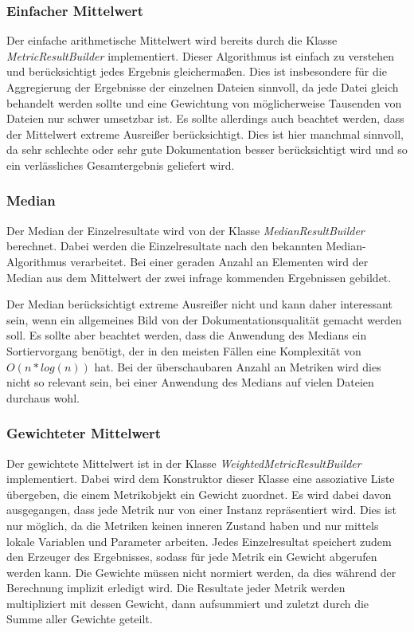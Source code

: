 \subsubsection{Einfacher Mittelwert}
Der einfache arithmetische Mittelwert wird bereits durch die Klasse \textit{MetricResultBuilder} implementiert. Dieser Algorithmus ist einfach zu verstehen und berücksichtigt jedes Ergebnis gleichermaßen. Dies ist insbesondere für die Aggregierung der Ergebnisse der einzelnen Dateien sinnvoll, da jede Datei gleich behandelt werden sollte und eine Gewichtung von möglicherweise Tausenden von Dateien nur schwer umsetzbar ist. Es sollte allerdings auch beachtet werden, dass der Mittelwert extreme Ausreißer berücksichtigt. Dies ist hier manchmal sinnvoll, da sehr schlechte oder sehr gute Dokumentation besser berücksichtigt wird und so ein verlässliches Gesamtergebnis geliefert wird.


\subsubsection{Median}
Der Median der Einzelresultate wird von der Klasse \textit{MedianResultBuilder} berechnet. Dabei werden die Einzelresultate nach den bekannten Median-Algorithmus verarbeitet. Bei einer geraden Anzahl an Elementen wird der Median aus dem Mittelwert der zwei infrage kommenden Ergebnissen gebildet. 

Der Median berücksichtigt extreme Ausreißer nicht und kann daher interessant sein, wenn ein allgemeines Bild von der Dokumentationsqualität gemacht werden soll. Es sollte aber beachtet werden, dass die Anwendung des Medians ein Sortiervorgang benötigt, der in den meisten Fällen eine Komplexität von $O(n*log(n))$ hat. Bei der überschaubaren Anzahl an Metriken wird dies nicht so relevant sein, bei einer Anwendung des Medians auf vielen Dateien durchaus wohl.


\subsubsection{Gewichteter Mittelwert}
Der gewichtete Mittelwert ist in der Klasse \textit{WeightedMetricResultBuilder} implementiert. Dabei wird dem Konstruktor dieser Klasse eine assoziative Liste übergeben, die einem Metrikobjekt ein Gewicht zuordnet.  Es wird dabei davon ausgegangen, dass jede Metrik nur von einer Instanz repräsentiert wird. Dies ist nur möglich, da die Metriken keinen inneren Zustand haben und nur mittels lokale Variablen und Parameter arbeiten. Jedes Einzelresultat speichert zudem den Erzeuger des Ergebnisses, sodass für jede Metrik ein Gewicht abgerufen werden kann. Die Gewichte müssen nicht normiert werden, da dies während der Berechnung implizit erledigt wird. Die Resultate jeder Metrik werden multipliziert mit dessen Gewicht, dann aufsummiert und zuletzt durch die Summe aller Gewichte geteilt. 


